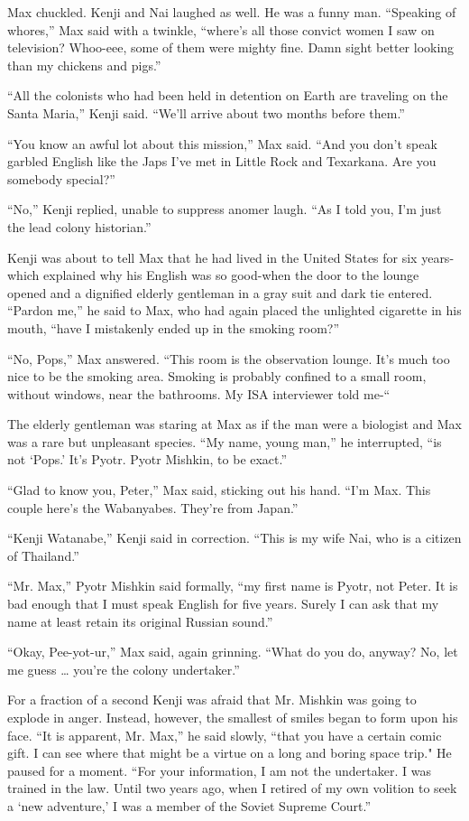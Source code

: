 \documentclass[]{article}
\begin{document}
{Max chuckled.  Kenji and Nai laughed as well.  He was a funny man.  “Speaking of whores,” Max said with a twinkle, “where’s all those convict women I saw on television? Whoo-eee, some of them were mighty fine.  Damn sight better looking than my chickens and pigs.”

“All the colonists who had been held in detention on Earth are traveling on the Santa Maria,” Kenji said.  “We’ll arrive about two months before them.”

“You know an awful lot about this mission,” Max said.  “And you don’t speak garbled English like the Japs I’ve met in Little Rock and Texarkana.  Are you somebody special?”

“No,” Kenji replied, unable to suppress anomer laugh.  “As I told you, I’m just the lead colony historian.”

Kenji was about to tell Max that he had lived in the United States for six years-which explained why his English was so good-when the door to the lounge opened and a dignified elderly gentleman in a gray suit and dark tie entered.  “Pardon me,” he said to Max, who had again placed the unlighted cigarette in his mouth, “have I mistakenly ended up in the smoking room?”

“No, Pops,” Max answered.  “This room is the observation lounge.  It’s much too nice to be the smoking area.  Smoking is probably confined to a small room, without windows, near the bathrooms.  My ISA interviewer told me-“

The elderly gentleman was staring at Max as if the man were a biologist and Max was a rare but unpleasant species.  “My name, young man,” he interrupted, “is not ‘Pops.’ It’s Pyotr.  Pyotr Mishkin, to be exact.”

“Glad to know you, Peter,” Max said, sticking out his hand.  “I’m Max.  This couple here’s the Wabanyabes.  They’re from Japan.”

“Kenji Watanabe,” Kenji said in correction.  “This is my wife Nai, who is a citizen of Thailand.”

“Mr.  Max,” Pyotr Mishkin said formally, “my first name is Pyotr, not Peter.  It is bad enough that I must speak English for five years.  Surely I can ask that my name at least retain its original Russian sound.”

“Okay, Pee-yot-ur,” Max said, again grinning.  “What do you do, anyway? No, let me guess … you’re the colony undertaker.”

For a fraction of a second Kenji was afraid that Mr.  Mishkin was going to explode in anger.  Instead, however, the smallest of smiles began to form upon his face.  “It is apparent, Mr.  Max,” he said slowly, “that you have a certain comic gift.  I can see where that might be a virtue on a long and boring space trip."  He paused for a moment.  “For your information, I am not the undertaker.  I was trained in the law.  Until two years ago, when I retired of my own volition to seek a ‘new adventure,’ I was a member of the Soviet Supreme Court.”

}
\end{document}

